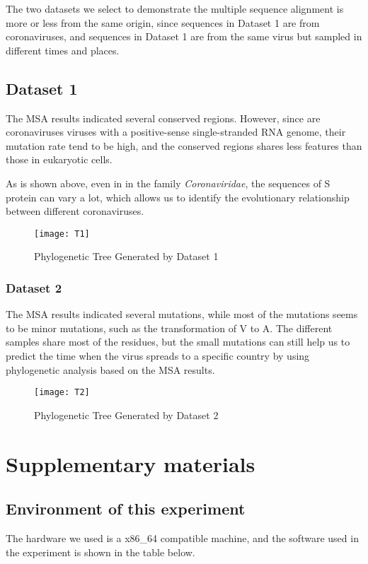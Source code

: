 The two datasets we select to demonstrate the multiple sequence alignment is more or less from the same origin, since sequences in Dataset 1 are from coronaviruses, and sequences in Dataset 1 are from the same virus but sampled in different times and places.

\subsection{Dataset 1}

The MSA results indicated several conserved regions. However, since are coronaviruses viruses with a positive-sense single-stranded RNA genome, their mutation rate tend to be high, and the conserved regions shares less features than those in eukaryotic cells.

As is shown above, even in in the family \textit{Coronaviridae}, the sequences of S protein can vary a lot, which allows us to identify the evolutionary relationship between different coronaviruses.

\begin{figure}[H]
    \centering
    \texttt{[image: T1]}
    \caption{Phylogenetic Tree Generated by Dataset 1}
    \label{T-01}
\end{figure}


\subsubsection{Dataset 2}

The MSA results indicated several mutations, while most of the mutations seems to be minor mutations, such as the transformation of V to A. The different samples share most of the residues, but the small mutations can still help us to predict the time when the virus spreads to a specific country by using phylogenetic analysis based on the MSA results.

\begin{figure}[H]
    \centering
    \texttt{[image: T2]}
    \caption{Phylogenetic Tree Generated by Dataset 2}
    \label{T-02}
\end{figure}



\section{Supplementary materials}



\subsection{Environment of this experiment}
The hardware we used is a x86\_64 compatible machine,
and the software used in the experiment is shown in the table below.


